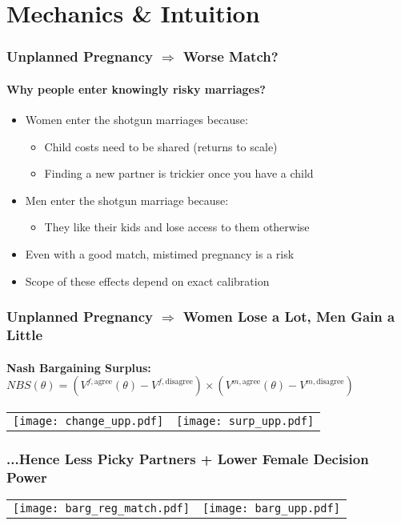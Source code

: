 \documentclass[aspectratio=169]{beamer}
\let\olditem\item
\renewcommand{\item}{%
\olditem\vspace{\fill}}
\begin{document}
\section{Mechanics \& Intuition}
\begin{frame}
\frametitle{Unplanned Pregnancy $\Rightarrow$ Worse Match?}
\framesubtitle{Why people enter knowingly risky marriages?}
\begin{itemize}
\item Women enter the shotgun marriages because:
\begin{itemize}
\item Child costs need to be shared (returns to scale)
\item Finding a new partner is trickier once you have a child
\end{itemize}
\item Men enter the shotgun marriage because:
\begin{itemize}
\item They like their kids and lose access to them otherwise
\end{itemize}
\item Even with a good match, mistimed pregnancy is a risk
\item Scope of these effects depend on exact calibration
\end{itemize}
\end{frame}


\begin{frame}
\frametitle{Unplanned Pregnancy $\Rightarrow$ Women Lose a Lot, Men Gain a Little}
\framesubtitle{Nash Bargaining Surplus: $NBS(\theta) = (V^{f,\text{agree}}(\theta) - V^{f,\text{disagree}})\times(V^{m,\text{agree}}(\theta) - V^{m,\text{disagree}})$}
\begin{center}
\begin{tabular}{c c}
\hspace{-1cm} \texttt{[image: change\_upp.pdf]} &
\hspace{-0.5cm}\texttt{[image: surp\_upp.pdf]} 
\end{tabular}

\end{center}

\end{frame}

\begin{frame}
\frametitle{...Hence Less Picky Partners + Lower Female Decision Power}
\begin{center}
\begin{tabular}{c c}
\hspace{-1cm} \texttt{[image: barg\_reg\_match.pdf]} & \texttt{[image: barg\_upp.pdf]}
\end{tabular}
\end{center}
\end{frame}
\end{document}

